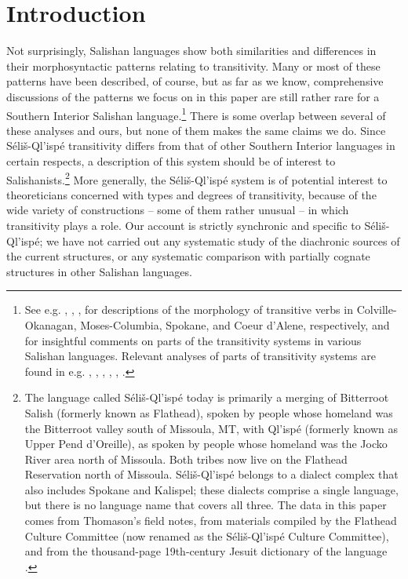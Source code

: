 \documentclass[output=paper,colorlinks,citecolor=brown]{langscibook}
\begin{document}
\section{Introduction}
\label{thomason_section_1}
  Not surprisingly, Salishan languages show both similarities and
  differences in their morphosyntactic patterns relating to
  transitivity.  Many or most of these patterns have been described,
  of course, but as far as we know, comprehensive discussions of the
  patterns we focus on in this paper are still rather rare for a
  Southern Interior Salishan language.\footnote{See e.g.
  , , ,
   for descriptions of
  the morphology of transitive verbs in Colville-Okanagan,
  Moses-Columbia, Spokane, and Coeur d'Alene, respectively, and
   for insightful comments on parts of the transitivity
  systems in various Salishan languages.  Relevant analyses of parts
  of transitivity systems are found in e.g. ,
  , , ,
  , .}
  There is some overlap between several of these analyses and ours,
  but none of them makes the same claims we do.  Since
  S\'eli\v{s}-Ql'isp\'e transitivity differs from that of other
  Southern Interior languages in certain respects, a description of
  this system should be of interest to Salishanists.\footnote{The
  language called S\'eli\v{s}-Ql'isp\'e today is primarily a merging
  of Bitterroot Salish (formerly known as Flathead), spoken by people
  whose homeland was the Bitterroot valley south of Missoula, MT,
  with Ql'isp\'e (formerly known as Upper Pend d'Oreille), as spoken
  by people whose homeland was the Jocko River area north of
  Missoula.  Both tribes now live on the Flathead Reservation north
  of Missoula.  S\'eli\v{s}-Ql'isp\'e belongs to a dialect complex
  that also includes Spokane and Kalispel; these dialects comprise a
  single language, but there is no language name that covers all
  three.  The data in this paper comes from Thomason's field notes,
  from materials compiled by the Flathead Culture Committee (now
  renamed as the S\'eli\v{s}-Ql'isp\'e Culture Committee), and from
  the thousand-page 19th-century Jesuit dictionary of the language
  .}  More generally, the
  S\'eli\v{s}-Ql'isp\'e system is of potential interest to
  theoreticians concerned with types and degrees of transitivity,
  because of the wide variety of constructions -- some of them
  rather unusual -- in which transitivity plays a role.  Our account
  is strictly synchronic and specific to S\'eli\v{s}-Ql'isp\'e; we
  have not carried out any systematic study of the diachronic sources
  of the current structures, or any systematic comparison with
  partially cognate structures in other Salishan languages.
\end{document}
